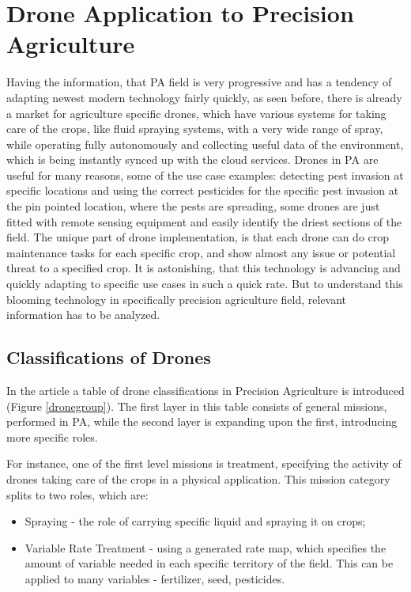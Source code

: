 \documentclass[11pt,a4paper,footinclude=true,headinclude=true, oneside]{scrbook}
\begin{document}
\chapter{Drone Application to Precision Agriculture}

Having the information, that PA field is very progressive and has a tendency of adapting newest modern technology fairly quickly, as seen before, there is already a market for agriculture specific drones, which have various systems for taking care of the crops, like fluid spraying systems, with a very wide range of spray, while operating fully autonomously and collecting useful data of the environment, which is being instantly synced up with the cloud services. Drones in PA are useful for many reasons, some of the use case examples: detecting pest invasion at specific locations and using the correct pesticides for the specific pest invasion at the pin pointed location, where the pests are spreading, some drones are just fitted with remote sensing equipment and easily identify the driest sections of the field. The unique part of drone implementation, is that each drone can do crop maintenance tasks for each specific crop, and show almost any issue or potential threat to a specified crop. It is astonishing, that this technology is advancing and quickly adapting to specific use cases in such a quick rate. But to understand this blooming technology in specifically precision agriculture field, relevant information has to be analyzed.

\section{Classifications of Drones}

In the article \cite{Bacco_Smart_2018} a table of drone classifications in Precision Agriculture is introduced (Figure \ref{dronegroup}). The first layer in this table consists of general missions, performed in PA, while the second layer is expanding upon the first, introducing more specific roles.

For instance, one of the first level missions is treatment, specifying the activity of drones taking care of the crops in a physical application. This mission category splits to two roles, which are:
\begin{itemize}
    \item Spraying - the role of carrying specific liquid and spraying it on crops;
    \item Variable Rate Treatment - using a generated rate map, which specifies the amount of variable needed in each specific territory of the field. This can be applied to many variables - fertilizer, seed, pesticides.
\end{itemize}
\end{document}
